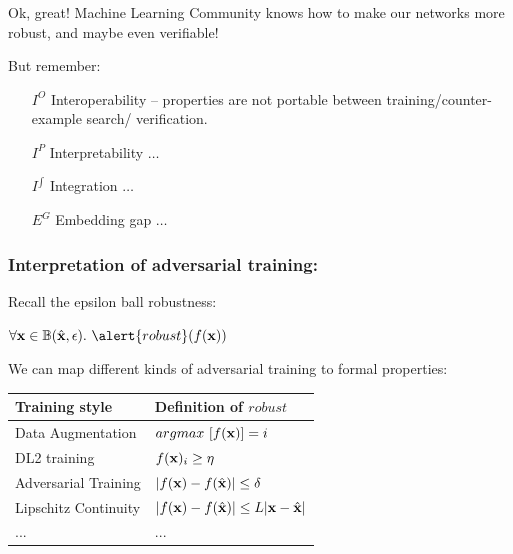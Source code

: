 \documentclass[aspectratio=169]{beamer}
\begin{document}
\begin{frame}
\frametitle{}

\begin{alertblock}{Ok, great!}
 Machine Learning Community knows how to make our networks more robust, and maybe even verifiable!
\end{alertblock}
\pause
But remember:

\begin{block}{}
\begin{itemize}
\item[$I^O$] \alert{Interoperability -- properties are not portable between training/counter-example search/ verification.}

\item[$I^{P}$] \alert{Interpretability} $\ldots$

\item[$I^{\int}$] Integration $\ldots$

\item[$E^G$] Embedding gap $\ldots$
\end{itemize}
\end{block}
\end{frame}

\begin{frame}
  \frametitle{Interpretation of adversarial training:}


      \begin{block}{Recall the epsilon ball robustness:}

       $\forall \x \in \mathbb{B}(\hat{\x}, \epsilon). \ \alert{robust}(f(\x)) $
\end{block}

     We can map different kinds of adversarial training to formal properties:
          	\begin{tabular}{p{3.5cm}|p{5.5cm}}
		Training style & Definition of \alert{$robust$}  \\ \hline \hline
		Data Augmentation & 	$ argmax\ [f(\mathbf{x})] = i$  \\ \hline
		DL2 training & 	$f(\mathbf{x})_i \geq \eta$  \\ \hline
		Adversarial Training & 	$ |f(\mathbf{x}) - f(\hat{\mathbf{x}})| \leq \delta$ \\ \hline
          Lipschitz Continuity & 	$ |f(\mathbf{x}) - f(\hat{\mathbf{x}})| \leq L|\mathbf{x}-\hat{\mathbf{x}}|$  \\ \hline
          ... & ... \\

	\end{tabular}


       {\scriptsize
 \begin{thebibliography}{99}
   \beamertemplatearticlebibitems
\end{thebibliography}}




  \end{frame}
\end{document}
